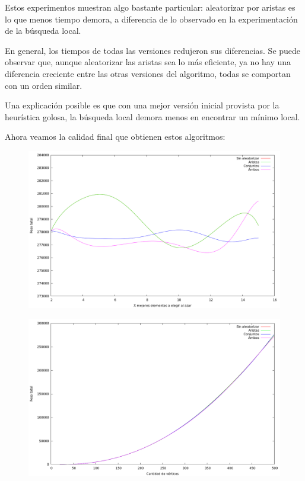 Estos experimentos muestran algo bastante particular: aleatorizar por aristas
es lo que menos tiempo demora, a diferencia de lo observado en la
experimentación de la búsqueda local.

En general, los tiempos de todas las versiones redujeron sus diferencias. Se
puede observar que, aunque aleatorizar las aristas sea lo más eficiente, ya no
hay una diferencia creciente entre las otras versiones del algoritmo, todas
se comportan con un orden similar.

Una explicación posible es que con una mejor versión inicial provista por
la heurística golosa, la búsqueda local demora menos en encontrar un mínimo
local.

Ahora veamos la calidad final que obtienen estos algoritmos:


\begin{figure}[H]
  \begin{center}
    \includegraphics[scale=0.35]{imagenes/grasp-local-x-peso.png}
  \end{center}
\end{figure}

\begin{figure}[H]
  \begin{center}
    \includegraphics[scale=0.35]{imagenes/grasp-local-n-peso.png}
  \end{center}
\end{figure}

